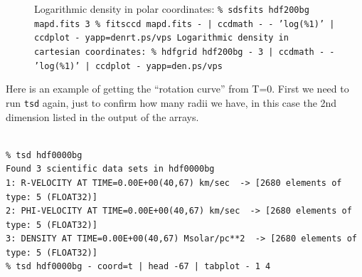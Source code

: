 \documentclass[10pt,dvips]{article}
\begin{document}
\begin{figure}[htbp]
\centering
{}
\hspace{0in}
\caption{
Logarithmic density in polar coordinates:\newline
  \tt \% sdsfits hdf200bg mapd.fits 3\newline
  \tt \% fitsccd mapd.fits - | ccdmath - - 'log(\%1)' | ccdplot - yapp=denrt.ps/vps\newline
Logarithmic density in cartesian coordinates:\newline
  \tt \% hdfgrid hdf200bg - 3 | ccdmath - - 'log(\%1)' | ccdplot - yapp=den.ps/vps\newline
}
\end{figure}

Here is an example of getting the ``rotation curve'' from T=0. First we need to run
{\tt tsd} again, just to confirm how many radii we have, in this case the 2nd
dimension listed in the output of the arrays.

\footnotesize\begin{verbatim}

% tsd hdf0000bg
Found 3 scientific data sets in hdf0000bg
1: R-VELOCITY AT TIME=0.00E+00(40,67) km/sec  -> [2680 elements of type: 5 (FLOAT32)]
2: PHI-VELOCITY AT TIME=0.00E+00(40,67) km/sec  -> [2680 elements of type: 5 (FLOAT32)]
3: DENSITY AT TIME=0.00E+00(40,67) Msolar/pc**2  -> [2680 elements of type: 5 (FLOAT32)]
% tsd hdf0000bg - coord=t | head -67 | tabplot - 1 4

\end{verbatim}\normalsize
\end{document}
